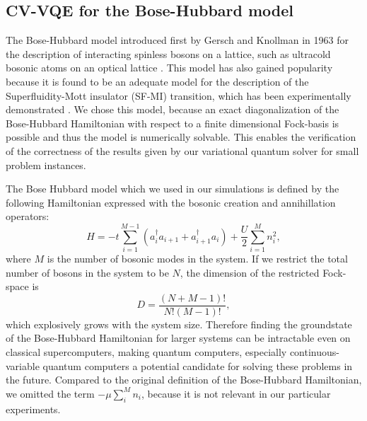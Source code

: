 \documentclass[12pt, a4paper,  nobibnotes]{article}
\begin{document}
\subsection{CV-VQE for the Bose-Hubbard model}
\label{sec:bh-vqe-results}
The Bose-Hubbard model introduced first by Gersch and Knollman in 1963 for the description of interacting spinless bosons on a lattice, such as ultracold bosonic atoms on an optical lattice
\cite{BoseHubbardOriginal,ColdAtomtHubbard}. This model has also gained popularity because it is found to be an adequate model for the description of the Superfluidity-Mott insulator (SF-MI) transition, which has been experimentally demonstrated \cite{SuperfluidityMottTransition,Greiner2002}.
We chose this model, because an exact diagonalization of the Bose-Hubbard Hamiltonian with respect to a finite dimensional Fock-basis is possible and thus the model is numerically solvable. This enables the verification of the correctness of the results given by our variational quantum solver for small problem instances.
\par
The Bose Hubbard model which we used in our simulations is defined by the following Hamiltonian expressed with the bosonic creation and annihillation operators:
\begin{equation}
     H = -t\sum\limits_{i=1}^{M-1}( a_{i}^\dagger  a_{i+1} +  a_{i+1}^\dagger  a_{i}) + \frac{U}{2}\sum\limits_{i=1}^{M} n_i^2 ,
     \label{eq:bhhamiltonian}
\end{equation}
where $M$ is the number of bosonic modes in the system. If we restrict the total number of bosons in the system to be $N$, the dimension of the restricted Fock-space is
\begin{equation}
    D = \frac{(N+M-1)!}{N!(M-1)!},
\end{equation}
which explosively grows with the system size. Therefore finding the groundstate of the Bose-Hubbard Hamiltonian for larger systems can be intractable even on classical supercomputers, making quantum computers, especially continuous-variable quantum computers a potential candidate for solving these problems in the future.
Compared to the original definition of the Bose-Hubbard Hamiltonian, we omitted the term $-\mu\sum\limits_{i}^{M} n_i$, because it is not relevant in our particular experiments.
\end{document}
